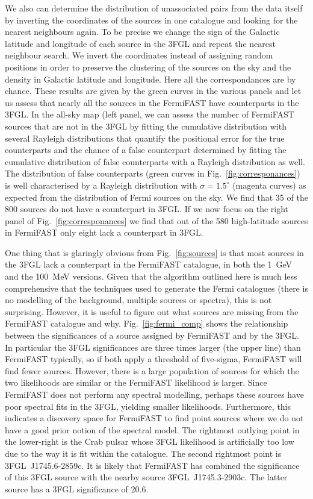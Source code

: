 \documentclass[useAMS,usenatbib]{mn2e}
\begin{document}
We also can determine the distribution of unassociated pairs from the
data itself by inverting the coordinates of the sources in one
catalogue and looking for the nearest neighbours again.  To be precise
we change the sign of the Galactic latitude and longitude of each
source in the 3FGL and repeat the nearest neighbour search.  We invert
the coordinates instead of assigning random positions in order to
preserve the clustering of the sources on the sky and the density in
Galactic latitude and longitude.  Here all the correspondances are by
chance.  These results are given by the green curves in the various
panels and let us assess that nearly all the sources in the FermiFAST
have counterparts in the 3FGL.  In the all-sky map (left panel, we can
assess the number of FermiFAST sources that are not in the 3FGL by
fitting the cumulative distribution with several Rayleigh
distributions that quantify the positional error for the true
counterparts and the chance of a false counterpart determined by
fitting the cumulative distribution of false counterparts with a
Rayleigh distribution as well.  The distribution of false counterparts
(green curves in Fig.~\ref{fig:corresponances}) is well characterised
by a Rayleigh distribution with $\sigma=1.5^\circ$ (magenta curves) as
expected from the distribution of Fermi sources on the sky. We find
that 35 of the 800 sources do not have a counterpart in 3FGL.  If we
now focus on the right panel of Fig.~\ref{fig:corresponances} we find
that out of the 580 high-latitude sources in FermiFAST only eight lack
a counterpart in 3FGL.

One thing that is glaringly obvious from Fig.~\ref{fig:sources} is
that most sources in the 3FGL lack a counterpart in the FermiFAST
catalogue, in both the 1~GeV and the 100~MeV versions.  Given that the
algorithm outlined here is much less comprehensive that the techniques
used to generate the Fermi catalogues (there is no modelling of the
background, multiple sources or spectra), this is not surprising.
However, it is useful to figure out what sources are missing from the
FermiFAST catalogue and why.  Fig.~\ref{fig:fermi_comp} shows the
relationship between the significances of a source assigned by
FermiFAST and by the 3FGL.  In particular the 3FGL significances are
three times larger (the upper line) than FermiFAST typically, so if
both apply a threshold of five-sigma, FermiFAST will find fewer
sources.  However, there is a large population of sources for which
the two likelihoods are similar or the FermiFAST likelihood is larger.
Since FermiFAST does not perform any spectral modelling, perhaps these
sources have poor spectral fits in the 3FGL, yielding smaller
likelihoods.  Furthermore, this indicates a discovery space for
FermiFAST to find point sources where we do not have a good prior
notion of the spectral model.  The rightmost outlying point in the
lower-right is the Crab pulsar whose 3FGL likelihood is artificially
too low due to the way it is fit within the catalogue.  The second
rightmost point is 3FGL~J1745.6-2859c. It is likely that FermiFAST has
combined the significance of this 3FGL source with the nearby source
3FGL~J1745.3-2903c.  The latter source has a 3FGL significance of 20.6.
\end{document}
